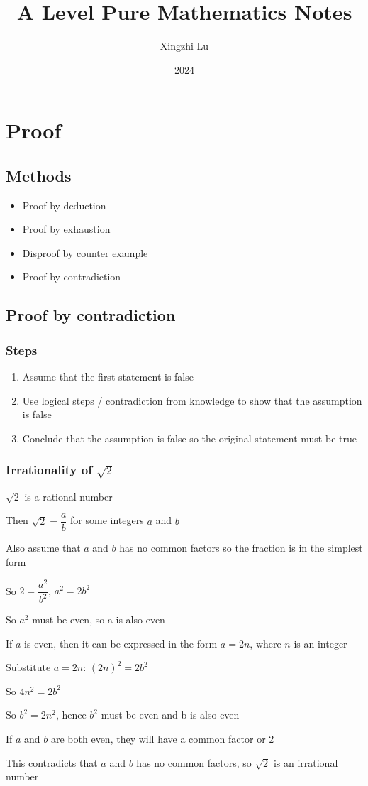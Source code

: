 \documentclass[A4paper]{article}
\title{A Level Pure Mathematics Notes}
\author{Xingzhi Lu}
\date{2024}
\begin{document}
	\maketitle
	\tableofcontents
	\pagebreak
	\section{Proof}
	\subsection{Methods}
	\begin{itemize}
		\item Proof by deduction
		\item Proof by exhaustion
		\item Disproof by counter example
		\item Proof by contradiction
	\end{itemize}
	\subsection{Proof by contradiction}
	\subsubsection{Steps}
	\begin{enumerate}
		\item Assume that the first statement is false
		\item Use logical steps / contradiction from knowledge to show that the assumption is false
		\item Conclude that the assumption is false so the original statement must be true
	\end{enumerate}
	\subsubsection{Irrationality of $\sqrt{2}$}
	\begin{description}
		\item [ Assumption:] $\sqrt{2}$ is a rational number
		\item Then $\sqrt{2} = \dfrac{a}{b}$ for some integers $a$ and $b$
		\item Also assume that $a$ and $b$ has no common factors so the fraction is in the simplest form
		\item So $2=\dfrac{a^2}{b^2}$, $a^2=2b^2$
		\item So $a^2$ must be even, so a is also even
		\item If $a$ is even, then it can be expressed in the form $a=2n$, where $n$ is an integer
		\item Substitute $a=2n$: $(2n)^2=2b^2$
		\item So $4n^2 = 2b^2$
		\item So $b^2=2n^2$, hence $b^2$ must be even and b is also even
		\item If $a$ and $b$ are both even, they will have a common factor or 2
		\item This contradicts that $a$ and $b$ has no common factors, so $\sqrt{2}$ is an irrational number
	\end{description}
\end{document}
